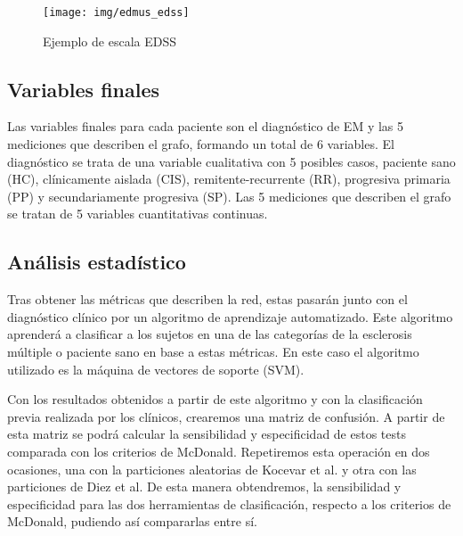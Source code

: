 \documentclass[fleqn,12pt]{UICArticle} %
\begin{document}
\begin{figure}[b]
	\centering
	\texttt{[image: img/edmus\_edss]}
	\vspace{5mm} 
	\caption{Ejemplo de escala EDSS}
	\label{fig:edss}
\end{figure}

\subsection{Variables finales}

Las variables finales para cada paciente son el diagnóstico de EM y las 5 mediciones que describen el grafo, formando un total de 6 variables. El diagnóstico se trata de una variable cualitativa con 5 posibles casos, paciente sano (HC), clínicamente aislada (CIS), remitente-recurrente (RR), progresiva primaria (PP) y secundariamente progresiva (SP). Las 5 mediciones que describen el grafo se tratan de 5 variables cuantitativas continuas.

\subsection{Análisis estadístico}
Tras obtener las métricas que describen la red, estas pasarán junto con el diagnóstico clínico por un algoritmo de aprendizaje automatizado. Este algoritmo aprenderá a clasificar a los sujetos en una de las categorías de la esclerosis múltiple o paciente sano en base a estas métricas. En este caso el algoritmo utilizado es la máquina de vectores de soporte (SVM).

Con los resultados obtenidos a partir de este algoritmo y con la clasificación previa realizada por los clínicos, crearemos una matriz de confusión. A partir de esta matriz se podrá calcular la sensibilidad y especificidad de estos tests comparada con los criterios de McDonald. Repetiremos esta operación en dos ocasiones, una con la particiones aleatorias de Kocevar et al. y otra con las particiones de Diez et al. De esta manera obtendremos, la sensibilidad y especificidad para las dos herramientas de clasificación, respecto a los criterios de McDonald, pudiendo así compararlas entre sí. 
\end{document}
